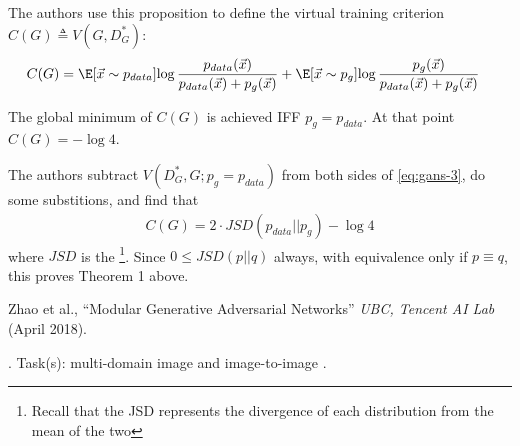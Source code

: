 \documentclass[11pt]{article}
\begin{document}
The authors use this proposition to define the virtual training criterion $C(G) \triangleq V(G, D^*_G)$:
\begin{align}
C(G)
&= \E[\vec x \sim p_{data}]{\log    \frac{ p_{data}(\vec x) }{ p_{data}(\vec x) + p_g(\vec x) }      } 
+  \E[\vec x \sim p_{g}]{\log    \frac{ p_{g}(\vec x) }{ p_{data}(\vec x) + p_g(\vec x) }      } \label{eq:gans-3}
\end{align}

\begin{definition}[-1em][Theorem 1.]
	The global minimum of $C(G)$ is achieved IFF $p_g = p_{data}$. At that point $C(G) = - \log4$. 
\end{definition}

\begin{example}
	The authors subtract $V(D^*_G, G; p_g{=}p_{data})$ from both sides of \ref{eq:gans-3}, do some substitions, and find that
	\begin{align}
	C(G) = 2 \cdot JSD(p_{data} || p_g) - \log 4
	\end{align}
	where $JSD$ is the \footnote{Recall that the JSD represents the divergence of each distribution from the mean of the two}. Since $0 \le JSD(p || q)$ always, with equivalence only if $p \equiv q$, this proves Theorem 1 above.
\end{example}




\vspace{-1em}
{\footnotesize Zhao et al., ``Modular Generative Adversarial Networks'' \textit{UBC, Tencent AI Lab} (April 2018).}

. Task(s): multi-domain image  and image-to-image .
\end{document}
